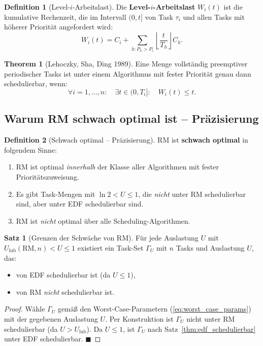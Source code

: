 ﻿\documentclass[a4paper,12pt]{report}
\theoremstyle{definition}
\newtheorem{definition}{Definition}[chapter]
\newtheorem{satz}{Satz}[chapter]
\newtheorem{theorem}{Theorem}[chapter]
\begin{document}
\begin{definition}[Level-$i$-Arbeitslast]
	Die \textbf{Level-$i$-Arbeitslast} $W_i(t)$ ist die kumulative Rechenzeit,
	die im Intervall $(0, t]$ von Task $\tau_i$ und allen Tasks mit höherer Priorität
	angefordert wird:
	\[
		W_i(t) = C_i + \sum_{h: P_h > P_i} \left\lfloor \frac{t}{T_h} \right\rfloor C_h.
	\]
\end{definition}

\begin{theorem}[Lehoczky, Sha, Ding 1989]
	Eine Menge vollständig preemptiver periodischer Tasks ist unter einem
	Algorithmus mit fester Priorität genau dann schedulierbar, wenn:
	\[
		\forall i = 1,\ldots,n: \quad \exists t \in (0, T_i]: \quad W_i(t) \leq t.
	\]
\end{theorem}

\subsection{Warum RM schwach optimal ist -- Präzisierung}

\begin{definition}[Schwach optimal -- Präzisierung]
	\label{def:schwach_optimal_praez}
	RM ist \textbf{schwach optimal} in folgendem Sinne:
	\begin{enumerate}
		\item RM ist optimal \emph{innerhalb} der Klasse aller Algorithmen mit
		      fester Prioritätszuweisung.
		\item Es gibt Task-Mengen mit $\ln 2 < U \leq 1$, die \emph{nicht} unter
		      RM schedulierbar sind, aber unter EDF schedulierbar sind.
		\item RM ist \emph{nicht} optimal über alle Scheduling-Algorithmen.
	\end{enumerate}
\end{definition}

\begin{satz}[Grenzen der Schwäche von RM]
	Für jede Auslastung $U$ mit $U_{\text{lub}}(\text{RM},n) < U \leq 1$ existiert
	ein Task-Set $\Gamma_U$ mit $n$ Tasks und Auslastung $U$, das:
	\begin{itemize}
		\item von EDF schedulierbar ist (da $U \leq 1$),
		\item von RM \emph{nicht} schedulierbar ist.
	\end{itemize}
\end{satz}

\begin{proof}
	Wähle $\Gamma_U$ gemäß den Worst-Case-Parametern (\ref{eq:worst_case_params})
	mit der gegebenen Auslastung $U$. Per Konstruktion ist $\Gamma_U$ nicht unter RM
	schedulierbar (da $U > U_{\text{lub}}$). Da $U \leq 1$, ist $\Gamma_U$ nach
	Satz~\ref{thm:edf_schedulierbar} unter EDF schedulierbar. \hfill$\blacksquare$
\end{proof}
\end{document}
